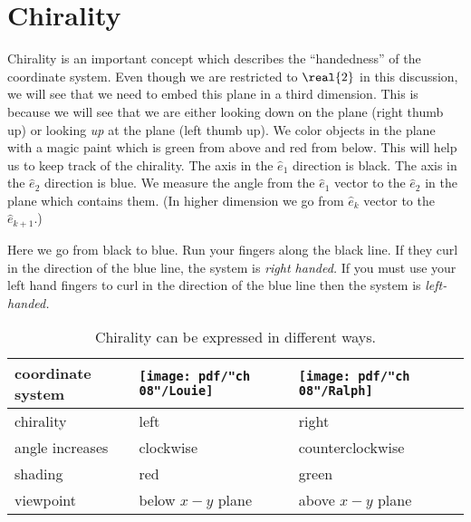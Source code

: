 \section{Chirality}
Chirality is an important concept which describes the ``handedness'' of the coordinate system. Even though we are restricted to $\real{2}$ in this discussion, we will see that we need to embed this plane in a third dimension. This is because we will see that we are either looking down on the plane (right thumb up) or looking \emph{up} at the plane (left thumb up). We color objects in the plane with a magic paint which is green from above and red from below. This will help us to keep track of the chirality. The axis in the $\hat{e}_{1}$ direction is black. The axis in the $\hat{e}_{2}$ direction is blue. We measure the angle from the $\hat{e}_{1}$ vector to the $\hat{e}_{2}$ in the plane which contains them. (In higher dimension we go from $\hat{e}_{k}$ vector to the $\hat{e}_{k+1}$.)

Here we go from black to blue. Run your fingers along the black line. If they curl in the direction of the blue line, the system is \emph{right handed.} If you must use your left hand fingers to curl in the direction of the blue line then the system is \emph{left-handed.}

\begin{table}[htdp]
\begin{center}
\begin{tabular}{l|ll}
 coordinate system & \texttt{[image: pdf/"ch 08"/Louie]} & \texttt{[image: pdf/"ch 08"/Ralph]} \\\hline
 chirality & left & right \\
 angle increases & clockwise & counterclockwise \\
 shading & red & green \\
 viewpoint & below $x-y$ plane & above $x-y$ plane
\end{tabular}
\end{center}
\caption[Chirality can be expressed in different ways]{Chirality can be expressed in different ways.}
\label{default}
\end{table}%


\endinput